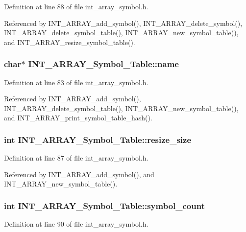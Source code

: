 Definition at line 88 of file int\_\-array\_\-symbol.h.

Referenced by INT\_\-ARRAY\_\-add\_\-symbol(), INT\_\-ARRAY\_\-delete\_\-symbol(), INT\_\-ARRAY\_\-delete\_\-symbol\_\-table(), INT\_\-ARRAY\_\-new\_\-symbol\_\-table(), and INT\_\-ARRAY\_\-resize\_\-symbol\_\-table().
\subsubsection{\setlength{\rightskip}{0pt plus 5cm}char$\ast$ \bf{INT\_\-ARRAY\_\-Symbol\_\-Table::name}}\label{structINT__ARRAY__Symbol__Table_c34a25ef07c6146f5a4434f8e549e012}




Definition at line 83 of file int\_\-array\_\-symbol.h.

Referenced by INT\_\-ARRAY\_\-add\_\-symbol(), INT\_\-ARRAY\_\-delete\_\-symbol\_\-table(), INT\_\-ARRAY\_\-new\_\-symbol\_\-table(), and INT\_\-ARRAY\_\-print\_\-symbol\_\-table\_\-hash().
\subsubsection{\setlength{\rightskip}{0pt plus 5cm}int \bf{INT\_\-ARRAY\_\-Symbol\_\-Table::resize\_\-size}}\label{structINT__ARRAY__Symbol__Table_d9e341901d3a4c1296d4bb120a96a66f}




Definition at line 87 of file int\_\-array\_\-symbol.h.

Referenced by INT\_\-ARRAY\_\-add\_\-symbol(), and INT\_\-ARRAY\_\-new\_\-symbol\_\-table().
\subsubsection{\setlength{\rightskip}{0pt plus 5cm}int \bf{INT\_\-ARRAY\_\-Symbol\_\-Table::symbol\_\-count}}\label{structINT__ARRAY__Symbol__Table_66fd696b2ac55c1722f5f38118c74815}




Definition at line 90 of file int\_\-array\_\-symbol.h.

